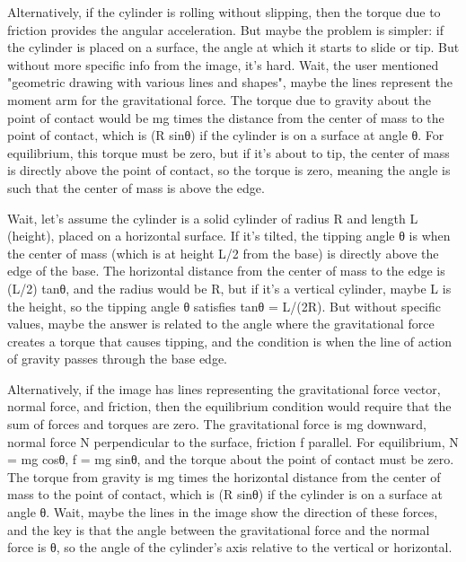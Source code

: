 Alternatively, if the cylinder is rolling without slipping, then the torque due to friction provides the angular acceleration. But maybe the problem is simpler: if the cylinder is placed on a surface, the angle at which it starts to slide or tip. But without more specific info from the image, it's hard. Wait, the user mentioned "geometric drawing with various lines and shapes", maybe the lines represent the moment arm for the gravitational force. The torque due to gravity about the point of contact would be mg times the distance from the center of mass to the point of contact, which is (R sinθ) if the cylinder is on a surface at angle θ. For equilibrium, this torque must be zero, but if it's about to tip, the center of mass is directly above the point of contact, so the torque is zero, meaning the angle is such that the center of mass is above the edge.

Wait, let's assume the cylinder is a solid cylinder of radius R and length L (height), placed on a horizontal surface. If it's tilted, the tipping angle θ is when the center of mass (which is at height L/2 from the base) is directly above the edge of the base. The horizontal distance from the center of mass to the edge is (L/2) tanθ, and the radius would be R, but if it's a vertical cylinder, maybe L is the height, so the tipping angle θ satisfies tanθ = L/(2R). But without specific values, maybe the answer is related to the angle where the gravitational force creates a torque that causes tipping, and the condition is when the line of action of gravity passes through the base edge.

Alternatively, if the image has lines representing the gravitational force vector, normal force, and friction, then the equilibrium condition would require that the sum of forces and torques are zero. The gravitational force is mg downward, normal force N perpendicular to the surface, friction f parallel. For equilibrium, N = mg cosθ, f = mg sinθ, and the torque about the point of contact must be zero. The torque from gravity is mg times the horizontal distance from the center of mass to the point of contact, which is (R sinθ) if the cylinder is on a surface at angle θ. Wait, maybe the lines in the image show the direction of these forces, and the key is that the angle between the gravitational force and the normal force is θ, so the angle of the cylinder's axis relative to the vertical or horizontal.

